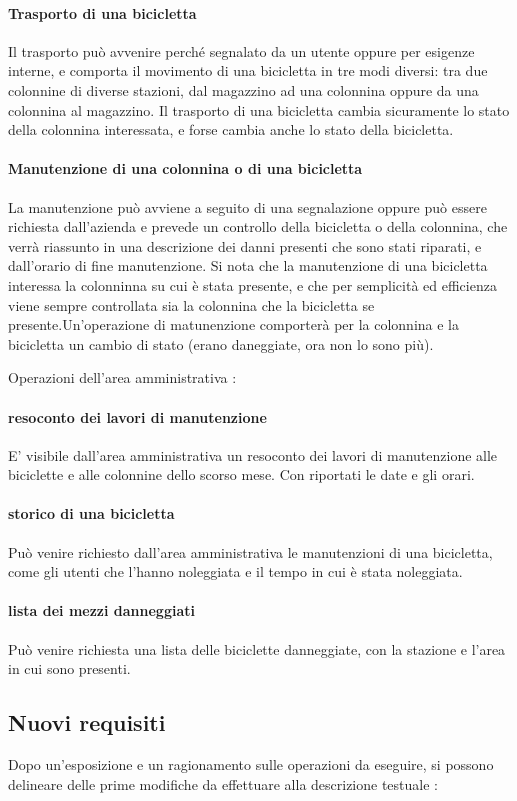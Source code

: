 \documentclass[a4paper,twoside]{article}
\begin{document}
\paragraph{Trasporto di una bicicletta} Il trasporto può avvenire perché segnalato da un utente oppure per esigenze interne, e comporta il movimento di una bicicletta in tre modi diversi: tra due colonnine di diverse stazioni, dal magazzino ad una colonnina oppure da una colonnina al magazzino. Il trasporto di una bicicletta cambia sicuramente lo stato della colonnina interessata, e forse cambia anche lo stato della bicicletta.
\paragraph{Manutenzione di una colonnina o di una bicicletta} La manutenzione può avviene a seguito di una segnalazione oppure può essere richiesta dall'azienda e prevede un controllo della bicicletta o della colonnina, che verrà riassunto in una descrizione dei danni presenti che sono stati riparati, e dall'orario di fine manutenzione. Si nota che la manutenzione di una bicicletta interessa la colonninna su cui è stata presente, e che per semplicità ed efficienza viene sempre controllata sia la colonnina che la bicicletta se presente.Un'operazione di matunenzione comporterà per la colonnina e la bicicletta un cambio di stato (erano daneggiate, ora non lo sono più).
\par Operazioni dell'area amministrativa :
\paragraph{resoconto dei lavori di manutenzione} E' visibile dall'area amministrativa un resoconto dei lavori di manutenzione alle biciclette e alle colonnine dello scorso mese. Con riportati le date e gli orari.
\paragraph{storico di una bicicletta} Può venire richiesto dall'area amministrativa le manutenzioni di una bicicletta, come gli utenti che l'hanno noleggiata e il tempo in cui è stata noleggiata.
\paragraph{lista dei mezzi danneggiati} Può venire richiesta una lista delle biciclette danneggiate, con la stazione e l'area in cui sono presenti.

\subsection{Nuovi requisiti}
Dopo un'esposizione e un ragionamento sulle operazioni da eseguire, si possono delineare delle prime modifiche da effettuare alla descrizione testuale :
\end{document}
